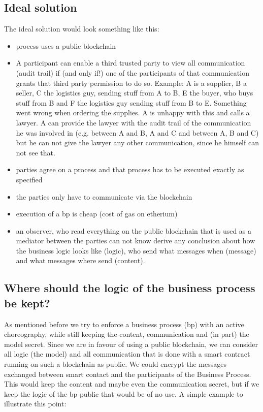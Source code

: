 \documentclass[runningheads]{llncs}
\begin{document}
\subsection{Ideal solution}
The ideal solution would look something like this: 
\begin{itemize}
    \item process uses a public blockchain
    \item A participant can enable a third trusted party to view all communication (audit trail) if (and only if!) one of the participants of that communication grants that third party permission to do so. Example: A is a supplier, B a seller, C the logistics guy, sending stuff from A to B, E the buyer, who buys stuff from B and F the logistics guy sending stuff from B to E. Something went wrong when ordering the supplies. A is unhappy with this and calls a lawyer. A can provide the lawyer with the audit trail of the communication he was involved in (e.g. between A and B, A and C and between A, B and C) but he can not give the lawyer any other communication, since he himself can not see that.
    \item parties agree on a process and that process has to be executed exactly as specified
    \item the parties only have to communicate via the blockchain
    \item execution of a bp is cheap (cost of gas on etherium)
    \item an observer, who read everything on the public blockchain that is used as a mediator between the parties can not know derive any conclusion about how the business logic looks like (logic), who send what messages when (message) and what messages where send (content).
\end{itemize}


\subsection{Where should the logic of the business process be kept?}


As mentioned before we try to enforce a business process (bp) with an active choreography, while still keeping the content, communication and (in part) the model secret. Since we are in favour of using a public blockchain, we can consider all logic (the model) and all communication that is done with a smart contract running on such a blockchain as public. We could encrypt the messages exchanged between smart contact and the participants of the Business Process. This would keep the content and maybe even the communication secret, but if we keep the logic of the bp public that would be of no use. A simple example to illustrate this point:
\end{document}
